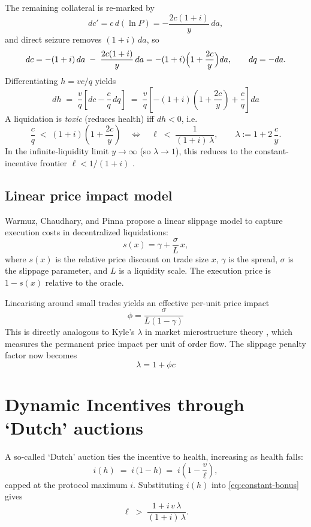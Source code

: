 \documentclass[11pt]{article}
\begin{document}
The remaining collateral is re-marked by
\[
dc' = c\,d(\ln P) = -\frac{2c(1+i)}{y}\,da,
\]
and direct seizure removes \((1+i)\,da\), so
\[
dc = - (1+i)\,da \;-\; \frac{2c(1+i)}{y}\,da
= -(1+i)\Bigl(1+\frac{2c}{y}\Bigr)da,
\qquad dq=-da.
\]
Differentiating \(h = v c/q\) yields
\[
dh \;=\; \frac{v}{q}\!\left[dc - \frac{c}{q}\,dq\right]
\;=\; \frac{v}{q}\!\left[-(1+i)\!\left(1+\frac{2c}{y}\right) + \frac{c}{q}\right]\!da
\]
A liquidation is \emph{toxic} (reduces health) iff \(dh<0\), i.e.
\begin{equation}
\frac{c}{q} \;<\; (1+i)\!\left(1+\frac{2c}{y}\right)
\quad\Longleftrightarrow\quad
\ell \;<\; \frac{1}{(1+i)\,\lambda},
\qquad
\lambda := 1 + 2\,\frac{c}{y}.
\label{eq:constant-bonus}
\end{equation}
In the infinite-liquidity limit \(y\to\infty\) (so \(\lambda\to 1\)), this reduces to the constant-incentive frontier \(\ell < 1/(1+i)\) \cite{WCP2022}.

\subsection{Linear price impact model}
Warmuz, Chaudhary, and Pinna \cite{WCP2022} propose a linear slippage model to capture execution costs in decentralized liquidations:
\[
s(x) = \gamma + \frac{\sigma}{L}\,x,
\]
where $s(x)$ is the relative price discount on trade size $x$, $\gamma$ is the spread, $\sigma$ is the slippage parameter, and $L$ is a liquidity scale. The execution price is $1-s(x)$ relative to the oracle.

Linearising around small trades yields an effective per-unit price impact
\[
\phi = \frac{\sigma}{L(1-\gamma)}
\]
This is directly analogous to Kyle’s $\lambda$ in market microstructure theory \cite{Kyle1985}, which measures the permanent price impact per unit of order flow. The slippage penalty factor now becomes
\[
\lambda = 1 + \phi c
\]

\section{Dynamic Incentives through `Dutch' auctions}
A so-called `Dutch' auction ties the incentive to health, increasing as health falls:
\[
i(h) \;=\; i\,\bigl(1-h\bigr)
\;=\; i\!\left(1 - \frac{v}{\ell}\right),
\]
capped at the protocol maximum \(i\). Substituting \(i(h)\) into \eqref{eq:constant-bonus} gives
\begin{equation}
\ell \;>\; \frac{1 + i\,v\,\lambda}{(1+i)\,\lambda}.
\label{eq:euler-dutch}
\end{equation}
\end{document}
